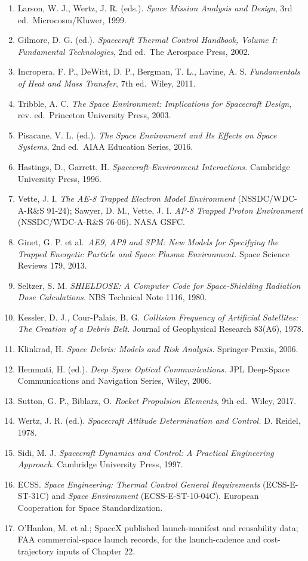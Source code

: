 \documentclass[
  11pt,
  openany,
  oneside]{book}
\begin{document}
\begin{enumerate}
\item
  Larson, W. J., Wertz, J. R. (eds.). \emph{Space Mission Analysis and
  Design}, 3rd ed.~Microcosm/Kluwer, 1999.
\item
  Gilmore, D. G. (ed.). \emph{Spacecraft Thermal Control Handbook,
  Volume I: Fundamental Technologies}, 2nd ed.~The Aerospace Press,
  2002.
\item
  Incropera, F. P., DeWitt, D. P., Bergman, T. L., Lavine, A. S.
  \emph{Fundamentals of Heat and Mass Transfer}, 7th ed.~Wiley, 2011.
\item
  Tribble, A. C. \emph{The Space Environment: Implications for
  Spacecraft Design}, rev. ed.~Princeton University Press, 2003.
\item
  Pisacane, V. L. (ed.). \emph{The Space Environment and Its Effects on
  Space Systems}, 2nd ed.~AIAA Education Series, 2016.
\item
  Hastings, D., Garrett, H. \emph{Spacecraft-Environment Interactions.}
  Cambridge University Press, 1996.
\item
  Vette, J. I. \emph{The AE-8 Trapped Electron Model Environment}
  (NSSDC/WDC-A-R\&S 91-24); Sawyer, D. M., Vette, J. I. \emph{AP-8
  Trapped Proton Environment} (NSSDC/WDC-A-R\&S 76-06). NASA GSFC.
\item
  Ginet, G. P. et al.~\emph{AE9, AP9 and SPM: New Models for Specifying
  the Trapped Energetic Particle and Space Plasma Environment.} Space
  Science Reviews 179, 2013.
\item
  Seltzer, S. M. \emph{SHIELDOSE: A Computer Code for Space-Shielding
  Radiation Dose Calculations.} NBS Technical Note 1116, 1980.
\item
  Kessler, D. J., Cour-Palais, B. G. \emph{Collision Frequency of
  Artificial Satellites: The Creation of a Debris Belt.} Journal of
  Geophysical Research 83(A6), 1978.
\item
  Klinkrad, H. \emph{Space Debris: Models and Risk Analysis.}
  Springer-Praxis, 2006.
\item
  Hemmati, H. (ed.). \emph{Deep Space Optical Communications.} JPL
  Deep-Space Communications and Navigation Series, Wiley, 2006.
\item
  Sutton, G. P., Biblarz, O. \emph{Rocket Propulsion Elements}, 9th
  ed.~Wiley, 2017.
\item
  Wertz, J. R. (ed.). \emph{Spacecraft Attitude Determination and
  Control.} D. Reidel, 1978.
\item
  Sidi, M. J. \emph{Spacecraft Dynamics and Control: A Practical
  Engineering Approach.} Cambridge University Press, 1997.
\item
  ECSS. \emph{Space Engineering: Thermal Control General Requirements}
  (ECSS-E-ST-31C) and \emph{Space Environment} (ECSS-E-ST-10-04C).
  European Cooperation for Space Standardization.
\item
  O'Hanlon, M. et al.; SpaceX published launch-manifest and reusability
  data; FAA commercial-space launch records, for the launch-cadence and
  cost-trajectory inputs of Chapter 22.
\end{enumerate}
\end{document}
